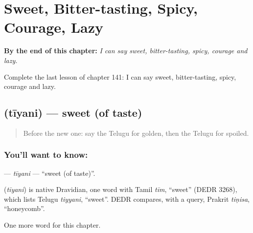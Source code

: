 
\chapter{Sweet, Bitter-tasting, Spicy, Courage, Lazy}
\label{ch:te-sweet-bitter-tasting-spicy-courage-lazy}

\begin{chapteropening}
\textbf{By the end of this chapter:} \emph{I can say sweet, bitter-tasting, spicy, courage and lazy.}

Complete the last lesson of chapter 141: I can say sweet, bitter-tasting, spicy, courage and lazy.
\end{chapteropening}

\section[\texorpdfstring{\te{తీయని} (tīyani)}{తీయని (tīyani)}]{ (tīyani) — sweet (of taste)}

\label{lesson:TE-C141-tiyani}



\begin{quote}
Before the new one: say the Telugu for golden, then the Telugu for spoiled.
\end{quote}

\subsection*{You'll want to know: }
\textbf{} — \emph{tīyani} — \textquotedblleft{}sweet (of taste)\textquotedblright{}.

\begin{cousinweb}
\textbf{} (\emph{tīyani}) is native Dravidian, one word with Tamil \emph{tīm}, \textquotedblleft{}sweet\textquotedblright{} (DEDR 3268), which lists Telugu \emph{tiyyani}, \textquotedblleft{}sweet\textquotedblright{}. DEDR compares, with a query, Prakrit \emph{tiṇisa}, \textquotedblleft{}honeycomb\textquotedblright{}.
\end{cousinweb}

\begin{grammarlens}[title={What you've built}]
One more word for this chapter.
\end{grammarlens}

